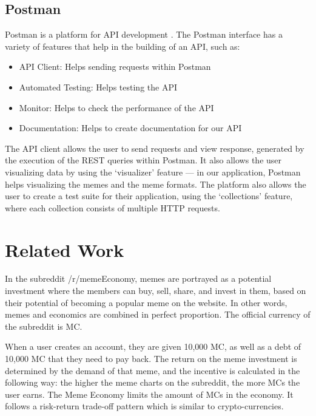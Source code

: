 \documentclass[12pt]{article}
\begin{document}
\subsection{Postman}
Postman is a platform for \ac{API} development \cite{Postman}. The Postman interface has a variety of features that help in the building of an \ac{API}, such as:
\begin{itemize}
    \item API Client: Helps sending requests within Postman
    \item Automated Testing: Helps testing the API
    \item Monitor: Helps to check the performance of the API
    \item Documentation: Helps to create documentation for our API
\end{itemize}

The \ac{API} client allows the user to send requests and view response, generated by the execution of the REST queries within Postman. It also allows the user visualizing data by using the `visualizer' feature --- in our application, Postman helps visualizing the memes and the meme formats. The platform also allows the user to create a test suite for their application, using the `collections' feature, where each collection consists of multiple HTTP requests.


\section{Related Work} \label{sec:Related Work}%
In the subreddit /r/memeEconomy, memes are portrayed as a potential investment where the members can buy, sell, share, and invest in them, based on their potential of becoming a popular meme on the website. In other words, memes and economics are combined in perfect proportion. The official currency of the subreddit is \ac{MC}.

When a user creates an account, they are given 10,000 \ac{MC}, as well as a debt of 10,000 \ac{MC} that they need to pay back. The return on the meme investment is determined by the demand of that meme, and the incentive is calculated in the following way: the higher the meme charts on the subreddit, the more \acp{MC} the user earns. The Meme Economy limits the amount of \acp{MC} in the economy. It follows a risk-return trade-off pattern which is similar to crypto-currencies.
\end{document}
